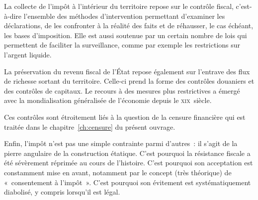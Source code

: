 La collecte de l'impôt à l'intérieur du territoire repose sur le contrôle fiscal, c'est-à-dire l'ensemble des méthodes d'intervention permettant d'examiner les déclarations, de les confronter à la réalité des faits et de réhausser, le cas échéant, les bases d'imposition. Elle est aussi soutenue par un certain nombre de lois qui permettent de faciliter la surveillance, comme par exemple les restrictions sur l'argent liquide. %

La préservation du revenu fiscal de l'État repose également sur l'entrave des flux de richesse sortant du territoire. Celle-ci prend la forme des contrôles douaniers et des contrôles de capitaux. Le recours à des mesures plus restrictives a émergé avec la mondialisation généralisée de l'économie depuis le \textsc{xix}\ieme{}~siècle. %



Ces contrôles sont étroitement liés à la question de la censure financière qui est traitée dans le chapitre~\ref{ch:censure} du présent ouvrage.


Enfin, l'impôt n'est pas une simple contrainte parmi d'autres~: il s'agit de la pierre angulaire de la construction étatique. C'est pourquoi la résistance fiscale a été sévèrement réprimée au cours de l'histoire. C'est pourquoi son acceptation est constamment mise en avant, notamment par le concept (très théorique) de «~consentement à l'impôt~». C'est pourquoi son évitement est systématiquement diabolisé, y compris lorsqu'il est légal.

